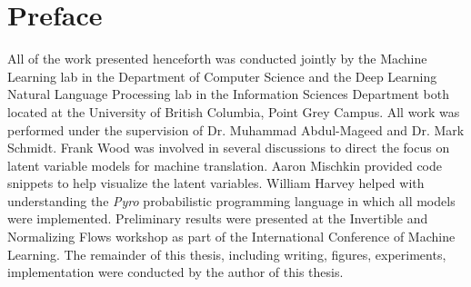 
\chapter{Preface}

All of the work presented henceforth was conducted jointly by the Machine Learning lab in the Department of Computer Science and the Deep Learning Natural Language Processing lab in the Information Sciences Department both located at the University of British Columbia, Point Grey Campus. All work was performed under the supervision of Dr. Muhammad Abdul-Mageed and Dr. Mark Schmidt. Frank Wood was involved in several discussions to direct the focus on latent variable models for machine translation. Aaron Mischkin provided code snippets to help visualize the latent variables. William Harvey helped with understanding the \textit{Pyro} probabilistic programming language in which all models were implemented. Preliminary results were presented at the Invertible and Normalizing Flows workshop as part of the International Conference of Machine Learning. The remainder of this thesis, including writing, figures, experiments, implementation were conducted by the author of this thesis.

